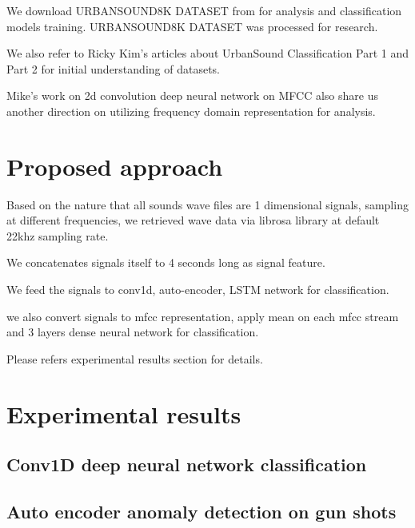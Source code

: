 \documentclass{article}
\begin{document}

We download URBANSOUND8K DATASET from \cite{URBANSOUND8K-DATASET} for analysis and classification models training. URBANSOUND8K DATASET was processed for \cite{Salamon:UrbanSound:ACMMM:14} research.


We also refer to Ricky Kim's articles about UrbanSound Classification Part 1 \cite{RickyKimUrbanSoundClassificationPart1soundwavedigitalaudiosignal} and Part 2 \cite{RickyKimUrbanSoundClassificationPart2samplerateconversionLibrosa} for initial understanding of datasets. 

Mike's work \cite{MikeSmalesSoundClassificationusingDeepLearning} on 2d convolution deep neural network on MFCC also share us another direction on utilizing frequency domain representation for analysis. 


\section{Proposed approach}
\label{sec:proposed approach}
Based on the nature that all sounds wave files are 1 dimensional signals, sampling at different frequencies, we retrieved wave data via librosa library at default 22khz sampling rate.

We concatenates signals itself to 4 seconds long as signal feature.

We feed the signals to conv1d, auto-encoder, LSTM network for classification.

we also convert signals to mfcc representation, apply mean on each mfcc stream and 3 layers dense neural network for classification.

Please refers experimental results section for details.

\section{Experimental results}
\label{sec:experimental results}

\subsection{Conv1D deep neural network classification}

\subsection{Auto encoder anomaly detection on gun shots}
\end{document}
